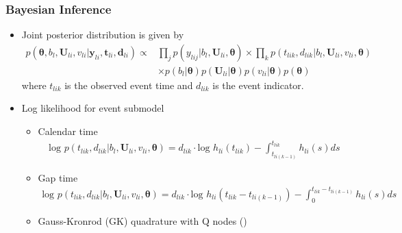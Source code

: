 \documentclass[fleqn]{beamer}
\begin{document}
\begin{frame}
\frametitle{Bayesian Inference}

\begin{itemize}
    \item Joint posterior distribution is given by
    \scriptsize
    \begin{align}
        p(\bm{\theta},b_l,\bm{U}_{li},v_{li}|\bm{y}_{li}, \bm{t}_{li}, \bm{d}_{li}) \propto & \prod_jp(y_{lij}|b_l,\bm{U}_{li},\bm{\theta})
        \times \prod_kp(t_{lik},d_{lik}|b_l,\bm{U}_{li},v_{li},\bm{\theta})\\\nonumber 
        & \times p(b_l|\bm{\theta})p(\bm{U}_{li}|\bm{\theta})p(v_{li}|\bm{\theta})p(\bm{\theta})
    \end{align}
where $t_{lik}$ is the observed event time and $d_{lik}$ is the event indicator.

    \item Log likelihood for event submodel
    
    \begin{itemize}
    \scriptsize
        \item Calendar time
        \begin{align}
       \mbox{log } p(t_{lik}, d_{lik}|b_l,\bm{U}_{li},v_{li},\bm{\theta}) = d_{lik} \cdot \mbox{log } h_{li}(t_{lik}) - \int^{t_{lik}}_{t_{li(k-1)}} h_{li}(s)ds 
    \end{align}
    
        \item Gap time
        \begin{align}
        \mbox{log } p(t_{lik}, d_{lik}|b_l,\bm{U}_{li},v_{li},\bm{\theta}) = d_{lik} \cdot \mbox{log } h_{li}(t_{lik}-t_{li(k-1)}) - \int^{t_{lik}-t_{li(k-1)}}_{0} h_{li}(s)ds
    \end{align}
    \item Gauss-Kronrod (GK) quadrature with Q nodes {\scriptsize (\cite{Laurie1997})}
    \end{itemize}
    
\end{itemize}
\end{frame}
\end{document}
